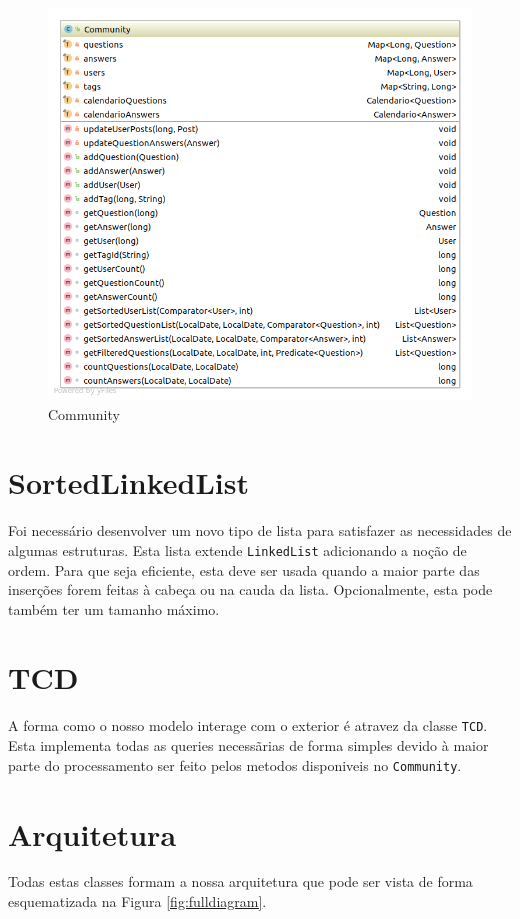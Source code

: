\documentclass[10pt,a4paper]{report}
\begin{document}
    \begin{figure}[H]
        \centering
        \includegraphics[width=\textwidth]{./images/Community.png}
        \caption{Community}
    \end{figure}

    \section{SortedLinkedList}
    \label{sec:sortedLinkedList}
    Foi necessário desenvolver um novo tipo de lista para satisfazer as
    necessidades de algumas estruturas.
    Esta lista extende \texttt{LinkedList} adicionando a noção de
    ordem. Para que seja eficiente, esta deve ser usada quando a maior parte
    das inserções forem feitas à cabeça ou na cauda da lista. Opcionalmente,
    esta pode também ter um tamanho máximo.

    \section{TCD}
    A forma como o nosso modelo interage com o exterior é atravez da classe
    \texttt{TCD}. Esta implementa todas as queries necessãrias de
    forma simples devido à maior parte do processamento ser feito pelos metodos
    disponiveis no \texttt{Community}.

    \section{Arquitetura}
    Todas estas classes formam a nossa arquitetura que pode ser vista de forma
    esquematizada na Figura \ref{fig:fulldiagram}.
\end{document}
